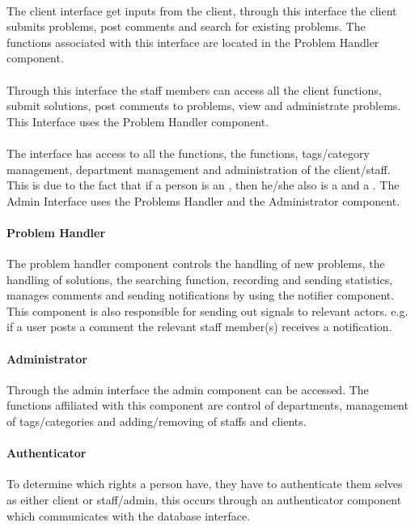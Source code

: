 \paragraph{\cinterface}
The client interface get inputs from the client, through this interface the client submits problems, post comments and search for existing problems.
The functions associated with this interface are located in the Problem Handler component.  

\paragraph{\sinterface}
Through this interface the staff members can access all the client functions, submit solutions, post comments to \open[] problems, view \worklist[] and administrate problems.
This Interface uses the Problem Handler component. 

\paragraph{\ainterface}  
The interface has access to all the \aclient[] functions, the \astaff[] functions, tags/category management, department management and administration of the client/staff. This is due to the fact that if a person is an \admin[], then he/she also is a \astaff[] and a \aclient[]. The Admin Interface uses the Problems Handler and the Administrator component. 

\paragraph{Problem Handler}
The problem handler component controls the handling of new problems, the handling of solutions, the searching function, recording and sending statistics, manages comments and sending notifications by using the notifier component.
This component is also responsible for sending out signals to relevant actors. e.g. if a user posts a comment the relevant staff member(s) receives a notification.  

\paragraph{Administrator}
Through the admin interface the admin component can be accessed. The functions affiliated with this component are control of departments, management of tags/categories and adding/removing of staffs and clients.   

\paragraph{Authenticator}
To determine which rights a person have, they have to authenticate them selves as either client or staff/admin, this occurs through an authenticator component which communicates with the database interface.   

